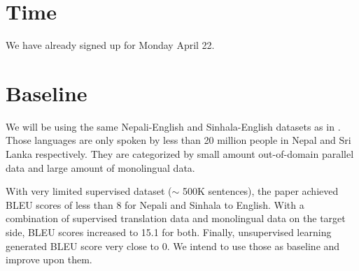 \documentclass[11pt]{article}
\begin{document}
\section{Time}

We have already signed up for Monday April 22.

\section{Baseline}

We will be using the same Nepali-English and Sinhala-English datasets as in \cite{guzman2019two}. Those languages are only spoken by less than 20 million people in Nepal and Sri Lanka respectively. They are categorized by small amount out-of-domain parallel data and large amount of monolingual data.

With very limited supervised dataset ($\sim$ 500K sentences), the paper achieved BLEU scores of less than 8 for Nepali and Sinhala to English. With a combination of supervised translation data and monolingual data on the target side, BLEU scores increased to 15.1 for both. Finally, unsupervised learning generated BLEU score very close to 0. We intend to use those as baseline and improve upon them.




\end{document}
